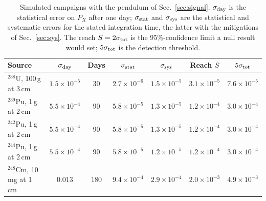 \begin{table}[!htbp]
\caption{\label{tab:campaign}Simulated campaigns with the pendulum of Sec.~\ref{sec:signal}. $\sigma_{\rm day}$ is
the statistical error on $P_X$ after one day; $\sigma_{\rm stat}$ and $\sigma_{\rm sys}$ are the statistical and
systematic errors for the stated integration time, the latter with the mitigations of Sec.~\ref{sec:sys}. The reach
$S=2\sigma_{\rm tot}$ is the 95\%-confidence limit a null result would set; $5\sigma_{\rm tot}$ is the detection
threshold.}
\begin{ruledtabular}
\begin{tabular}{lcccccc}
Source & $\sigma_{\rm day}$ & Days & $\sigma_{\rm stat}$ & $\sigma_{\rm sys}$ & Reach $S$ & $5\sigma_{\rm tot}$\\
\hline
$^{238}$U, 100\,g at 3\,cm & $1.5\times10^{-5}$ & 30 & $2.7\times10^{-6}$ & $1.5\times10^{-5}$ & $3.1\times10^{-5}$ & $7.6\times10^{-5}$ \\
$^{239}$Pu, 1\,g at 2\,cm & $5.5\times10^{-4}$ & 90 & $5.8\times10^{-5}$ & $1.3\times10^{-5}$ & $1.2\times10^{-4}$ & $3.0\times10^{-4}$ \\
$^{242}$Pu, 1\,g at 2\,cm & $5.5\times10^{-4}$ & 90 & $5.8\times10^{-5}$ & $1.3\times10^{-5}$ & $1.2\times10^{-4}$ & $3.0\times10^{-4}$ \\
$^{244}$Pu, 1\,g at 2\,cm & $5.5\times10^{-4}$ & 90 & $5.8\times10^{-5}$ & $1.2\times10^{-5}$ & $1.2\times10^{-4}$ & $3.0\times10^{-4}$ \\
$^{248}$Cm, 10\,mg at 1\,cm & $0.013$ & 180 & $9.4\times10^{-4}$ & $2.9\times10^{-4}$ & $2.0\times10^{-3}$ & $4.9\times10^{-3}$ \\
\end{tabular}
\end{ruledtabular}
\end{table}
